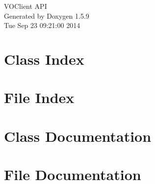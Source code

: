 \documentclass[a4paper]{book}
\begin{document}
\hypersetup{pageanchor=false}
\begin{titlepage}
\vspace*{7cm}
\begin{center}
{\Large VOClient API }\\
\vspace*{1cm}
{\large Generated by Doxygen 1.5.9}\\
\vspace*{0.5cm}
{\small Tue Sep 23 09:21:00 2014}\\
\end{center}
\end{titlepage}
\clearemptydoublepage
{}
\tableofcontents
\clearemptydoublepage
{}
\hypersetup{pageanchor=true}
\chapter{Class Index}

\chapter{File Index}

\chapter{Class Documentation}









\chapter{File Documentation}























\printindex
\end{document}
